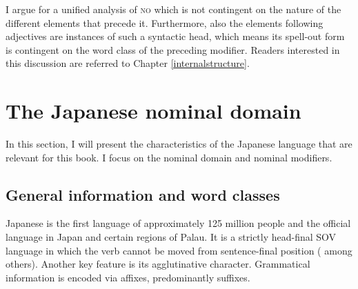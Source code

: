 \documentclass [output=book,colorlinks,citecolor=brown]{langscibook}
\begin{document}
I argue for a unified analysis of \textsc{no} which is not contingent on the nature of the different elements that precede it. Furthermore, also the elements following adjectives are instances of such a syntactic head, which means its spell-out form is contingent on the word class of the preceding modifier. Readers interested in this discussion are referred to Chapter \ref{internalstructure}.

\section{The Japanese nominal domain} \label{intro japanese}

In this section, I will present the characteristics of the Japanese language that are relevant for this book. I focus on the nominal domain and nominal modifiers.

\subsection{General information and word classes}

Japanese is the first language of approximately 125 million people and the official language in Japan and certain regions of Palau. It is a strictly head-final SOV language in which the verb cannot be moved from sentence-final position (\citealt{kuno:1973:structure, martin:1975:reference, iwasaki:2013:japanese} among others). Another key feature is its agglutinative character. Grammatical information is encoded via affixes, predominantly suffixes. %
\end{document}
